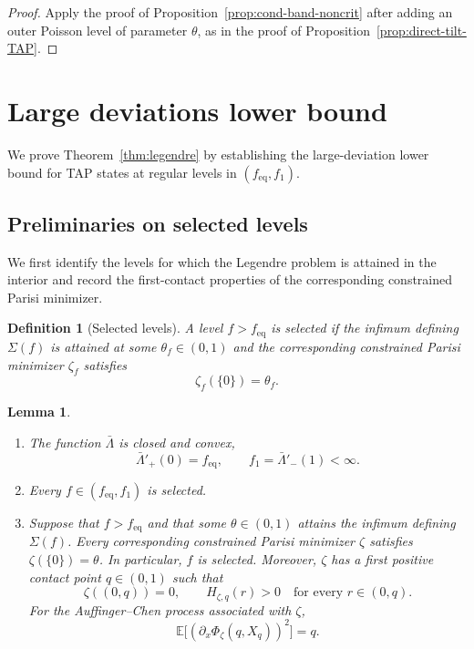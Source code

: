 \documentclass[a4paper,10pt,reqno]{amsart}
\numberwithin{equation}{section}
\newtheorem{lemma}[proposition]{Lemma}%
\newtheorem{definition}[proposition]{Definition}%
\newcommand{\dE}{\mathbb{E}}%
\newcommand{\eq}{\mathrm{eq}}
\begin{document}
	\begin{proof}
		Apply the proof of Proposition~\ref{prop:cond-band-noncrit} after
		adding an outer Poisson level of parameter $\theta$, as in the proof
		of Proposition~\ref{prop:direct-tilt-TAP}.
	\end{proof}
	
	\section{Large deviations lower bound}\label{sec:onshell-lb}
	
	We prove Theorem~\ref{thm:legendre} by establishing the large-deviation
	lower bound for TAP states at regular levels in \((f_{\eq},f_1)\).
	
	\subsection{Preliminaries on selected levels}
	
	We first identify the levels for which the Legendre problem is attained in
	the interior and record the first-contact properties of the corresponding
	constrained Parisi minimizer.
	
	\begin{definition}[Selected levels]\label{def:selected-levels}
		A level \(f>f_{\eq}\) is selected if the infimum defining
		\(\Sigma(f)\) is attained at some \(\theta_f\in(0,1)\) and the
		corresponding constrained Parisi minimizer \(\zeta_f\) satisfies
		\[
		\zeta_f(\{0\})=\theta_f.
		\]
	\end{definition}
	
	\begin{lemma}\label{lem:selected-first-contact}
		\begin{enumerate}[label=\textup{(\arabic*)}]
			\item The function \(\bar\Lambda\) is closed and convex,
			\[
			\bar\Lambda'_+(0)=f_{\eq},
			\qquad
			f_1=\bar\Lambda'_-(1)<\infty.
			\]
			
			\item Every \(f\in(f_{\eq},f_1)\) is selected.
			
			\item Suppose that \(f>f_{\eq}\) and that some
			\(\theta\in(0,1)\) attains the infimum defining \(\Sigma(f)\).
			Every corresponding constrained Parisi minimizer \(\zeta\) satisfies
			\(\zeta(\{0\})=\theta\). In particular, \(f\) is selected. Moreover,
			\(\zeta\) has a first positive
			contact point \(q\in(0,1)\) such that
			\[
			\zeta((0,q))=0,
			\qquad
			H_{\zeta,q}(r)>0
			\quad\text{for every \(r\in(0,q)\)}.
			\]
			For the Auffinger--Chen process associated with \(\zeta\),
			\[
			\dE\bigl[(\partial_x\Phi_\zeta(q,X_q))^2\bigr]=q.
			\]
		\end{enumerate}
	\end{lemma}
	
\end{document}
